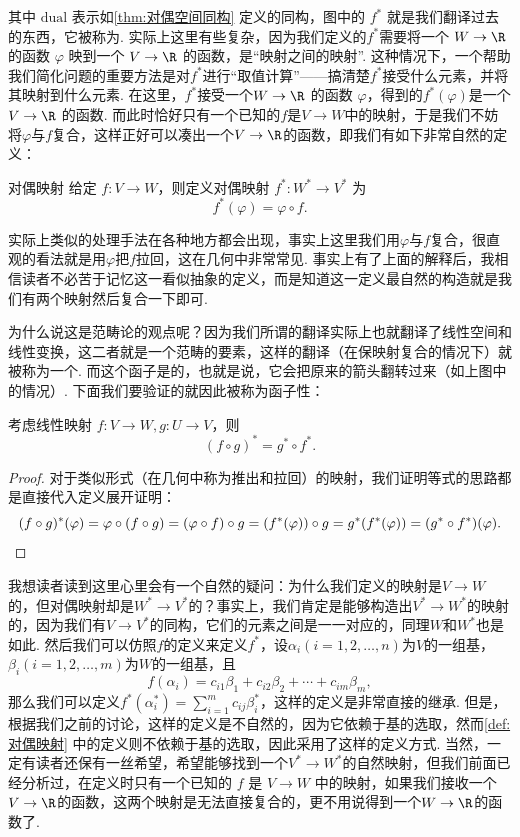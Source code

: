 其中 $\text{dual}$ 表示如\autoref{thm:对偶空间同构} 定义的同构，图中的 $f^*$ 就是我们翻译过去的东西，它被称为. 实际上这里有些复杂，因为我们定义的$f^*$需要将一个 $W \to \R$ 的函数 $\varphi$ 映到一个 $V \to \R$ 的函数，是``映射之间的映射''. 这种情况下，一个帮助我们简化问题的重要方法是对$f^*$进行``取值计算''——搞清楚$f^*$接受什么元素，并将其映射到什么元素. 在这里，$f^*$接受一个$W \to \R$ 的函数 $\varphi$，得到的$f^*(\varphi)$是一个$V \to \R$ 的函数. 而此时恰好只有一个已知的$f$是$V\to W$中的映射，于是我们不妨将$\varphi$与$f$复合，这样正好可以凑出一个$V \to \R$的函数，即我们有如下非常自然的定义：
\begin{definition}{}{对偶映射}
    给定 $f\colon V \to W$，则定义对偶映射 $f^*: W^* \to V^*$ 为
    \[f^*(\varphi) = \varphi \circ f.\]
\end{definition}
实际上类似的处理手法在各种地方都会出现，事实上这里我们用$\varphi$与$f$复合，很直观的看法就是用$\varphi$把$f$拉回，这在几何中非常常见. 事实上有了上面的解释后，我相信读者不必苦于记忆这一看似抽象的定义，而是知道这一定义最自然的构造就是我们有两个映射然后复合一下即可.

为什么说这是范畴论的观点呢？因为我们所谓的翻译实际上也就翻译了线性空间和线性变换，这二者就是一个范畴的要素，这样的翻译（在保映射复合的情况下）就被称为一个. 而这个函子是的，也就是说，它会把原来的箭头翻转过来（如上图中的情况）. 下面我们要验证的就因此被称为函子性：

\begin{lemma}{}{}
    考虑线性映射 $f\colon V \to W, g: U \to V$，则
    \[
        (f \circ g)^* = g^* \circ f^*.
    \]
\end{lemma}

\begin{proof}
    对于类似形式（在几何中称为推出和拉回）的映射，我们证明等式的思路都是直接代入定义展开证明：
    \[
        (f \circ g)^* (\varphi) = \varphi \circ (f \circ g) = (\varphi \circ f) \circ g = (f^*(\varphi)) \circ g = g^* (f^*(\varphi)) = (g^* \circ f^*)(\varphi). \qedhere
    \]
\end{proof}

我想读者读到这里心里会有一个自然的疑问：为什么我们定义的映射是$V\to W$的，但对偶映射却是$W^*\to V^*$的？事实上，我们肯定是能够构造出$V^*\to W^*$的映射的，因为我们有$V\to V^*$的同构，它们的元素之间是一一对应的，同理$W$和$W^*$也是如此. 然后我们可以仿照$f$的定义来定义$f^*$，设$\alpha_i(i=1,2,\ldots,n)$为$V$的一组基，$\beta_i(i=1,2,\ldots,m)$为$W$的一组基，且
\[f(\alpha_i)=c_{i1}\beta_1+c_{i2}\beta_2+\cdots+c_{im}\beta_m,\]
那么我们可以定义$f^*(\alpha_i^*)=\sum\limits_{i=1}^m c_{ij}\beta_i^*$，这样的定义是非常直接的继承. 但是，根据我们之前的讨论，这样的定义是不自然的，因为它依赖于基的选取，然而\autoref{def:对偶映射} 中的定义则不依赖于基的选取，因此采用了这样的定义方式. 当然，一定有读者还保有一丝希望，希望能够找到一个$V^*\to W^*$的自然映射，但我们前面已经分析过，在定义时只有一个已知的 $f$ 是 $V\to W$ 中的映射，如果我们接收一个$V\to \R$的函数，这两个映射是无法直接复合的，更不用说得到一个$W\to \R$的函数了.

